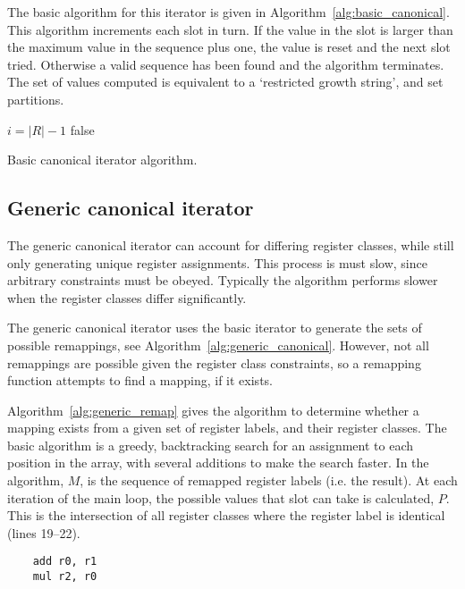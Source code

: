 \documentclass{article}
\begin{document}
The basic algorithm for this iterator is given in Algorithm~\ref{alg:basic_canonical}. This algorithm increments each slot in turn. If the value in the slot is larger than the maximum value in the sequence plus one, the value is reset and the next slot tried. Otherwise a valid sequence has been found and the algorithm terminates. The set of values computed is equivalent to a `restricted growth string', and set partitions.
\begin{algorithm}
    $i = |R| - 1$\;
    \Return false\;
\caption{Basic canonical iterator algorithm.}
\label{alg:basic_canonical}
\end{algorithm}

\subsection{Generic canonical iterator}

The generic canonical iterator can account for differing register classes, while still only generating unique register assignments. This process is must slow, since arbitrary constraints must be obeyed. Typically the algorithm performs slower when the register classes differ significantly.

The generic canonical iterator uses the basic iterator to generate the sets of possible remappings, see Algorithm~\ref{alg:generic_canonical}. However, not all remappings are possible given the register class constraints, so a remapping function attempts to find a mapping, if it exists.

Algorithm~\ref{alg:generic_remap} gives the algorithm to determine whether a mapping exists from a given set of register labels, and their register classes. The basic algorithm is a greedy, backtracking search for an assignment to each position in the array, with several additions to make the search faster. In the algorithm, $M$, is the sequence of remapped register labels (i.e. the result). At each iteration of the main loop, the possible values that slot can take is calculated, $P$. This is the intersection of all register classes where the register label is identical (lines 19--22).

\begin{minipage}{0.3\textwidth}
\begin{verbatim}
    add r0, r1
    mul r2, r0
\end{verbatim}
\end{minipage}
\end{document}
